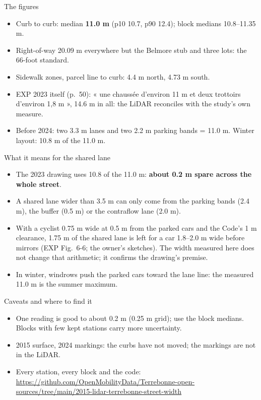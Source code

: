 \documentclass[aspectratio=169,11pt]{beamer}\usetheme{default}\usecolortheme{seahorse}\setbeamertemplate{navigation symbols}{}\setbeamertemplate{footline}[frame number]
\begin{document}
\begin{frame}{The figures}\begin{itemize}
\item Curb to curb: median \textbf{11.0 m} (p10 10.7, p90 12.4); block medians 10.8--11.35 m.
\item Right-of-way 20.09 m everywhere but the Belmore stub and three lots: the 66-foot standard.
\item Sidewalk zones, parcel line to curb: 4.4 m north, 4.73 m south.
\item EXP 2023 itself (p.~50): « une chaussée d\textquoteright{}environ 11 m et deux trottoirs d\textquoteright{}environ 1,8 m », 14.6 m in all: the LiDAR reconciles with the study\textquoteright{}s own measure.
\item Before 2024: two 3.3 m lanes and two 2.2 m parking bands = 11.0 m. Winter layout: 10.8 m of the 11.0 m.
\end{itemize}\end{frame}
\begin{frame}{What it means for the shared lane}\begin{itemize}
\item The 2023 drawing uses 10.8 of the 11.0 m: \textbf{about 0.2 m spare across the whole street}.
\item A shared lane wider than 3.5 m can only come from the parking bands (2.4 m), the buffer (0.5 m) or the contraflow lane (2.0 m).
\item With a cyclist 0.75 m wide at 0.5 m from the parked cars and the Code\textquoteright{}s 1 m clearance, 1.75 m of the shared lane is left for a car 1.8--2.0 m wide before mirrors (EXP Fig.~6-6; the owner\textquoteright{}s sketches). The width measured here does not change that arithmetic; it confirms the drawing\textquoteright{}s premise.
\item In winter, windrows push the parked cars toward the lane line: the measured 11.0 m is the summer maximum.
\end{itemize}\end{frame}
\begin{frame}{Caveats and where to find it}\begin{itemize}
\item One reading is good to about 0.2 m (0.25 m grid); use the block medians. Blocks with few kept stations carry more uncertainty.
\item 2015 surface, 2024 markings: the curbs have not moved; the markings are not in the LiDAR.
\item Every station, every block and the code: \url{https://github.com/OpenMobilityData/Terrebonne-open-sources/tree/main/2015-lidar-terrebonne-street-width}
\end{itemize}\end{frame}
\end{document}
